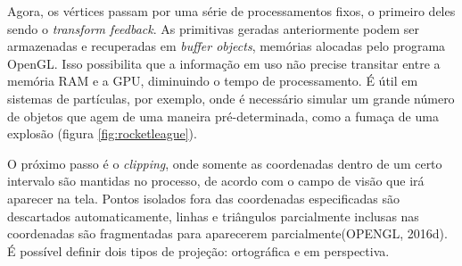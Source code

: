 Agora, os vértices passam por uma série de processamentos fixos, o primeiro deles sendo o \textit{transform feedback}. As primitivas geradas anteriormente podem ser armazenadas e recuperadas em \textit{buffer objects}, memórias alocadas pelo programa OpenGL. Isso possibilita que a informação em uso não precise transitar entre a memória RAM e a GPU, diminuindo o tempo de processamento. É útil em sistemas de partículas, por exemplo, onde é necessário simular um grande número de objetos que agem de uma maneira pré-determinada, como a fumaça de uma explosão (figura \ref{fig:rocketleague}).
	
O próximo passo é o \textit{clipping}, onde somente as coordenadas dentro de um certo intervalo são mantidas no processo, de acordo com o campo de visão que irá aparecer na tela. Pontos isolados fora das coordenadas especificadas são descartados automaticamente, linhas e triângulos parcialmente inclusas nas coordenadas são fragmentadas para aparecerem parcialmente(OPENGL, 2016d).  É possível definir dois tipos de projeção: ortográfica e em perspectiva.

